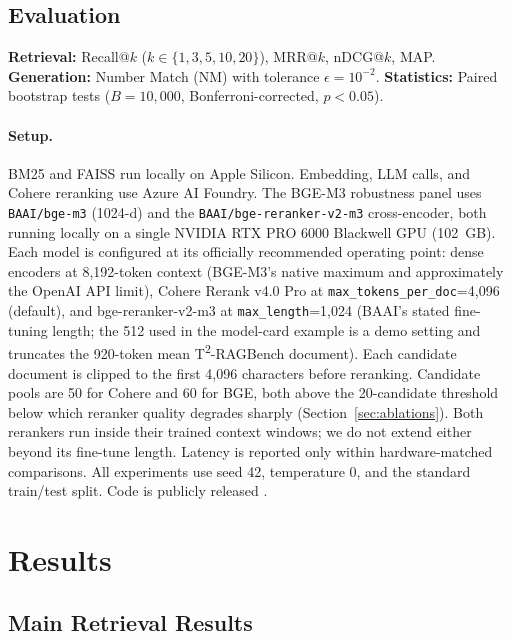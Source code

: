 \documentclass{article}
\begin{document}
\subsection{Evaluation}
\label{sec:metrics}

\textbf{Retrieval:} Recall@$k$ ($k \in \{1,3,5,10,20\}$), MRR@$k$, nDCG@$k$, MAP. \textbf{Generation:} Number Match (NM) with tolerance $\epsilon = 10^{-2}$. \textbf{Statistics:} Paired bootstrap tests ($B = 10{,}000$, Bonferroni-corrected, $p < 0.05$).

\paragraph{Setup.}
\label{sec:setup}
BM25 and FAISS run locally on Apple Silicon. Embedding, LLM calls, and Cohere reranking use Azure AI Foundry. The BGE-M3 robustness panel uses \texttt{BAAI/bge-m3} (1024-d) \citep{chen2024bgem3} and the \texttt{BAAI/bge-reranker-v2-m3} cross-encoder, both running locally on a single NVIDIA RTX PRO 6000 Blackwell GPU (102~GB). Each model is configured at its officially recommended operating point: dense encoders at 8{,}192-token context (BGE-M3's native maximum and approximately the OpenAI API limit), Cohere Rerank v4.0 Pro at \texttt{max\_tokens\_per\_doc}=4{,}096 (default), and bge-reranker-v2-m3 at \texttt{max\_length}=1{,}024 (BAAI's stated fine-tuning length; the 512 used in the model-card example is a demo setting and truncates the 920-token mean T\textsuperscript{2}-RAGBench document). Each candidate document is clipped to the first 4{,}096 characters before reranking. Candidate pools are 50 for Cohere and 60 for BGE, both above the 20-candidate threshold below which reranker quality degrades sharply (Section~\ref{sec:ablations}). Both rerankers run inside their trained context windows; we do not extend either beyond its fine-tune length. Latency is reported only within hardware-matched comparisons. All experiments use seed 42, temperature 0, and the standard train/test split. Code is publicly released \citep{anon2026ragcode}.

\section{Results}
\label{sec:results}

\subsection{Main Retrieval Results}
\label{sec:main_results}
\end{document}
